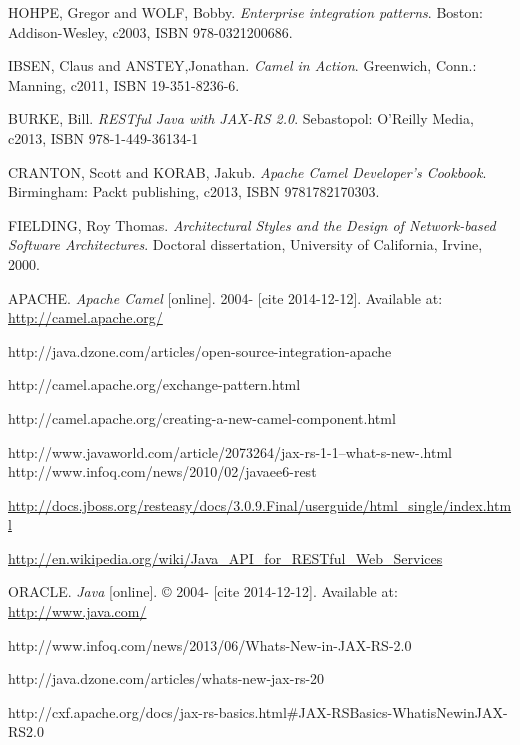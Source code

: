 \documentclass[12pt,final,oneside]{fithesis2}
\begin{document}
\begin{thebibliography}{}


 HOHPE, Gregor and WOLF, Bobby. \textit{Enterprise integration patterns}. Boston: Addison-Wesley, c2003, ISBN 978-0321200686.

 IBSEN, Claus and ANSTEY,Jonathan. \textit{Camel in Action}. Greenwich, Conn.: Manning, c2011, ISBN 19-351-8236-6.

 BURKE, Bill. \textit{RESTful Java with JAX-RS 2.0}. Sebastopol: O'Reilly Media, c2013, ISBN 978-1-449-36134-1

 CRANTON, Scott and KORAB, Jakub. \textit{Apache Camel Developer's Cookbook}.  Birmingham: Packt publishing, c2013, ISBN 9781782170303.

 FIELDING, Roy Thomas. \textit{Architectural Styles and the Design of Network-based Software Architectures}. Doctoral dissertation, University of California, Irvine, 2000. 

 APACHE. \textit{Apache Camel} [online]. 2004- [cite 2014-12-12]. Available at: \url{http://camel.apache.org/}

 http://java.dzone.com/articles/open-source-integration-apache

 http://camel.apache.org/exchange-pattern.html

 http://camel.apache.org/creating-a-new-camel-component.html




 http://www.javaworld.com/article/2073264/jax-rs-1-1--what-s-new-.html
 http://www.infoq.com/news/2010/02/javaee6-rest

\url{http://docs.jboss.org/resteasy/docs/3.0.9.Final/userguide/html_single/index.html}

 \url{http://en.wikipedia.org/wiki/Java_API_for_RESTful_Web_Services}



 ORACLE. \textit{Java} [online]. \copyright{} 2004- [cite 2014-12-12]. Available at: \url{http://www.java.com/}		

 http://www.infoq.com/news/2013/06/Whats-New-in-JAX-RS-2.0

 http://java.dzone.com/articles/whats-new-jax-rs-20 	

 http://cxf.apache.org/docs/jax-rs-basics.html\#JAX-RSBasics-WhatisNewinJAX-RS2.0

%

%
%




\end{thebibliography}
\end{document}
